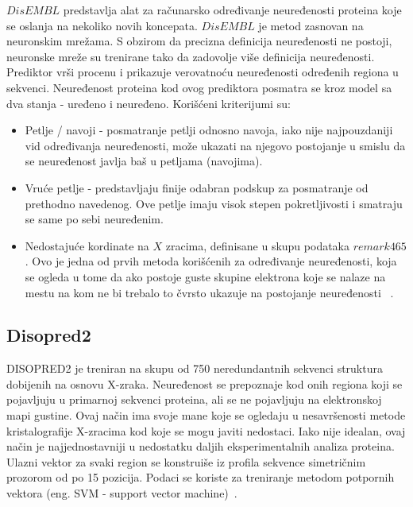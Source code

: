 $DisEMBL$ predstavlja alat za računarsko određivanje neuređenosti proteina koje se oslanja na nekoliko novih koncepata. $DisEMBL$ je metod zasnovan na neuronskim mrežama. S obzirom da precizna definicija neuređenosti ne postoji, neuronske mreže su trenirane tako da zadovolje više definicija neuređenosti. Prediktor vrši procenu i prikazuje verovatnoću neuređenosti određenih regiona u sekvenci. Neuređenost proteina kod ovog prediktora posmatra se kroz model sa dva stanja - uređeno i neuređeno. Korišćeni kriterijumi su:
\begin{itemize}
\item Petlje / navoji  - posmatranje petlji odnosno navoja, iako nije najpouzdaniji vid određivanja neuređenosti, može ukazati na njegovo postojanje u smislu da se neuređenost javlja baš u petljama (navojima).
\item Vruće petlje - predstavljaju finije odabran podskup za posmatranje od prethodno navedenog. Ove petlje imaju visok stepen pokretljivosti i smatraju se same po sebi neuređenim. 
\item Nedostajuće kordinate na $X$ zracima, definisane u skupu podataka $remark465$. Ovo je jedna od prvih metoda korišćenih za određivanje neuređenosti, koja se ogleda u tome da ako postoje guste skupine elektrona koje se nalaze na mestu na kom ne bi trebalo to čvrsto ukazuje na postojanje neuređenosti ~\cite{DISEMBL}.  
\end{itemize}



\subsection{Disopred2}

DISOPRED2 je treniran na skupu od 750 neredundantnih sekvenci struktura dobijenih na osnovu X-zraka.  Neuređenost se prepoznaje kod onih regiona koji se pojavljuju u primarnoj sekvenci proteina, ali se ne pojavljuju na elektronskoj mapi gustine. Ovaj način ima svoje mane koje se ogledaju u nesavršenosti metode kristalografije X-zracima kod koje se mogu javiti nedostaci. Iako nije idealan, ovaj način je najjednostavniji u nedostatku daljih eksperimentalnih analiza proteina. Ulazni vektor za svaki region se konstruiše iz profila sekvence simetričnim prozorom od po 15 pozicija. Podaci se koriste za treniranje  metodom potpornih vektora (eng. SVM - support vector machine)~\cite{DISOPRED}.


